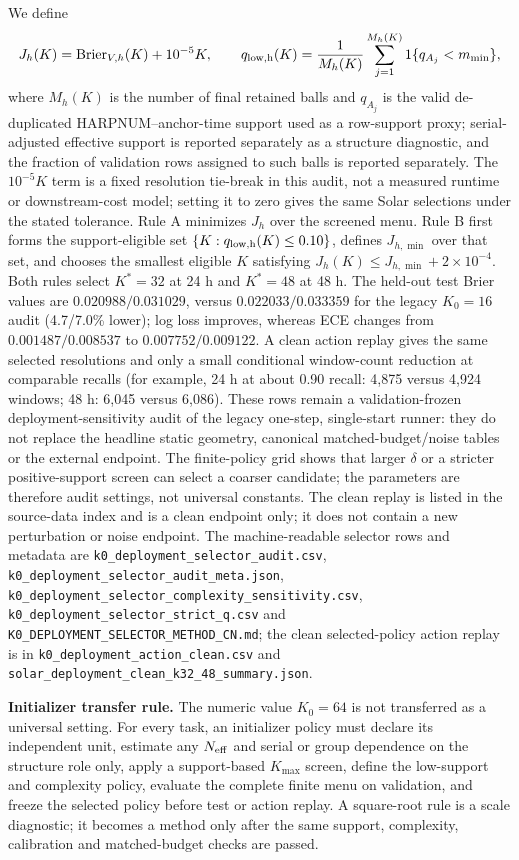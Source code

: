 \documentclass[11pt,a4paper]{article}
\numberwithin{equation}{section}
\theoremstyle{definition}\newtheorem{definition}[theorem]{Definition}
\theoremstyle{remark}\newtheorem{remark}[theorem]{Remark}
\begin{document}
We define
\[
J_h(K)=\operatorname{Brier}_{V,h}(K)+10^{-5}K,
\qquad
q_{\rm low,h}(K)=\frac{1}{M_h(K)}\sum_{j=1}^{M_h(K)}1\{q_{A_j}<m_{\min}\},
\]
where $M_h(K)$ is the number of final retained balls and $q_{A_j}$ is the valid de-duplicated HARPNUM--anchor-time support used as a row-support proxy; serial-adjusted effective support is reported separately as a structure diagnostic, and the fraction of validation rows assigned to such balls is reported separately. The $10^{-5}K$ term is a fixed resolution tie-break in this audit, not a measured runtime or downstream-cost model; setting it to zero gives the same Solar selections under the stated tolerance. Rule A minimizes $J_h$ over the screened menu. Rule B first forms the support-eligible set $\{K:q_{\rm low,h}(K)\leq0.10\}$, defines $J_{h,\min}$ over that set, and chooses the smallest eligible $K$ satisfying $J_h(K)\leq J_{h,\min}+2\times10^{-4}$. Both rules select $K^*=32$ at 24 h and $K^*=48$ at 48 h. The held-out test Brier values are $0.020988/0.031029$, versus $0.022033/0.033359$ for the legacy $K_0=16$ audit (4.7/7.0\% lower); log loss improves, whereas ECE changes from $0.001487/0.008537$ to $0.007752/0.009122$. A clean action replay gives the same selected resolutions and only a small conditional window-count reduction at comparable recalls (for example, 24 h at about 0.90 recall: 4,875 versus 4,924 windows; 48 h: 6,045 versus 6,086). These rows remain a validation-frozen deployment-sensitivity audit of the legacy one-step, single-start runner: they do not replace the headline static geometry, canonical matched-budget/noise tables or the external endpoint. The finite-policy grid shows that larger $\delta$ or a stricter positive-support screen can select a coarser candidate; the parameters are therefore audit settings, not universal constants. The clean replay is listed in the source-data index and is a clean endpoint only; it does not contain a new perturbation or noise endpoint. The machine-readable selector rows and metadata are \texttt{k0\_deployment\_selector\_audit.csv}, \texttt{k0\_deployment\_selector\_audit\_meta.json}, \texttt{k0\_deployment\_selector\_complexity\_sensitivity.csv}, \texttt{k0\_deployment\_selector\_strict\_q.csv} and \texttt{K0\_DEPLOYMENT\_SELECTOR\_METHOD\_CN.md}; the clean selected-policy action replay is in \texttt{k0\_deployment\_action\_clean.csv} and \texttt{solar\_deployment\_clean\_k32\_48\_summary.json}.

\textbf{Initializer transfer rule.} The numeric value $K_0=64$ is not transferred as a universal setting. For every task, an initializer policy must declare its independent unit, estimate any $N_{\rm eff}$ and serial or group dependence on the structure role only, apply a support-based $K_{\max}$ screen, define the low-support and complexity policy, evaluate the complete finite menu on validation, and freeze the selected policy before test or action replay. A square-root rule is a scale diagnostic; it becomes a method only after the same support, complexity, calibration and matched-budget checks are passed.
\end{document}
